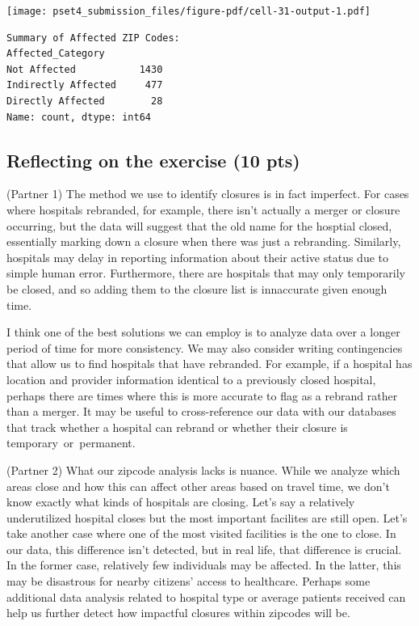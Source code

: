 \documentclass[
  letterpaper,
  DIV=11,
  numbers=noendperiod]{scrartcl}
\begin{document}
\texttt{[image: pset4\_submission\_files/figure-pdf/cell-31-output-1.pdf]}

\begin{verbatim}
Summary of Affected ZIP Codes:
Affected_Category
Not Affected           1430
Indirectly Affected     477
Directly Affected        28
Name: count, dtype: int64
\end{verbatim}

\subsection{Reflecting on the exercise (10
pts)}\label{reflecting-on-the-exercise-10-pts}

(Partner 1) The method we use to identify closures is in fact imperfect.
For cases where hospitals rebranded, for example, there isn't actually a
merger or closure occurring, but the data will suggest that the old name
for the hosptial closed, essentially marking down a closure when there
was just a rebranding. Similarly, hospitals may delay in reporting
information about their active status due to simple human error.
Furthermore, there are hospitals that may only temporarily be closed,
and so adding them to the closure list is innaccurate given enough time.

I think one of the best solutions we can employ is to analyze data over
a longer period of time for more consistency. We may also consider
writing contingencies that allow us to find hospitals that have
rebranded. For example, if a hospital has location and provider
information identical to a previously closed hospital, perhaps there are
times where this is more accurate to flag as a rebrand rather than a
merger. It may be useful to cross-reference our data with our databases
that track whether a hospital can rebrand or whether their closure is
temporary~or~permanent.

(Partner 2) What our zipcode analysis lacks is nuance. While we analyze
which areas close and how this can affect other areas based on travel
time, we don't know exactly what kinds of hospitals are closing. Let's
say a relatively underutilized hospital closes but the most important
facilites are still open. Let's take another case where one of the most
visited facilities is the one to close. In our data, this difference
isn't detected, but in real life, that difference is crucial. In the
former case, relatively few individuals may be affected. In the latter,
this may be disastrous for nearby citizens' access to healthcare.
Perhaps some additional data analysis related to hospital type or
average patients received can help us further detect how impactful
closures within zipcodes will be.
\end{document}
